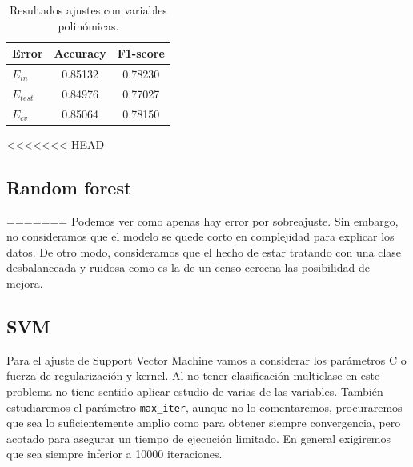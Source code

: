 \documentclass[11pt,a4paper]{article}
\begin{document}
\begin{table}[h]
\begin{center}
\begin{tabular}{|l|c|c|}
\hline
  Error & Accuracy & F1-score \\ \hline
  $E_{in}$ & 0.85132 & 0.78230 \\
  $E_{test}$ & 0.84976 & 0.77027  \\
  $E_{cv}$ &0.85064 & 0.78150  \\\hline
\end{tabular}
\caption{Resultados ajustes con variables polinómicas.}

\end{center}
\end{table}

<<<<<<< HEAD
\subsection{Random forest}
=======
Podemos ver como apenas hay error por sobreajuste. Sin embargo, no consideramos que el modelo se quede corto en complejidad para explicar los datos. De otro modo, consideramos que el hecho de estar tratando con una clase desbalanceada y ruidosa como es la de un censo cercena las posibilidad de mejora. 


\subsection{SVM\cite{svc}}

Para el ajuste de Support Vector Machine vamos a considerar los parámetros C o  fuerza de regularización y kernel. Al no tener clasificación multiclase en este problema no tiene sentido aplicar estudio de varias de las variables. También estudiaremos el parámetro \texttt{max\_iter}, aunque no lo comentaremos, procuraremos que sea lo suficientemente amplio como para obtener siempre convergencia, pero acotado para asegurar un tiempo de ejecución limitado. En general exigiremos que sea siempre inferior a 10000 iteraciones.\\
\end{document}
